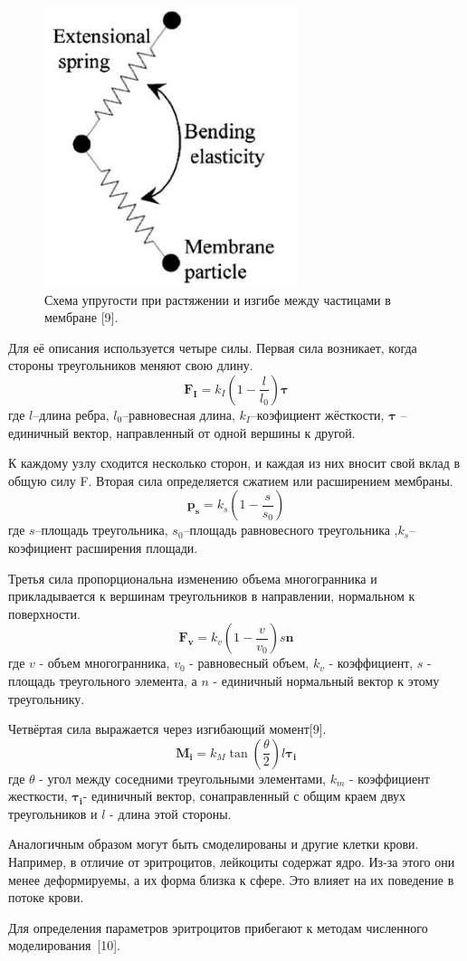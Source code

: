\begin{figure}[h]
\centering
\includegraphics[width=0.3\linewidth]{mol3.png}
\caption{ Схема упругости при растяжении и изгибе между частицами в мембране [9].}
\label{fig:mpr}
\end{figure}

Для её описания используется четыре силы.
Первая сила возникает, когда стороны треугольников меняют свою длину.
$$\mathbf {F_I}=k_I(1- \frac{l}{l_0}) \mathbf {\tau}$$
где $l$--длина ребра, $l_0$--равновесная длина, $k_I$--коэфициент жёсткости, $\mathbf { \tau}$ --единичный вектор, направленный от одной вершины к другой.

К каждому узлу сходится несколько сторон, и каждая из них вносит свой вклад в общую силу F. Вторая сила определяется сжатием или расширением мембраны.  
$$\mathbf {p_s}=k_s(1- \frac{s}{s_0})$$
где $s$--площадь треугольника, $s_0$--площадь равновесного треугольника ,$k_s$--коэфициент расширения площади.

Третья сила пропорциональна изменению объема многогранника и прикладывается к вершинам треугольников в направлении, нормальном к поверхности. 
$$\mathbf {F_v}=k_v(1- \frac{v}{v_0}) s \mathbf{n}$$
где $v$ - объем многогранника, $v_0$ - равновесный объем, $k_v$ - коэффициент, $s$ - площадь
треугольного элемента, а $n$ - единичный нормальный вектор к этому треугольнику.

Четвёртая сила выражается через изгибающий момент[9].
$$\mathbf {M_i}=k_M \tan(\frac{\theta}{2})l \mathbf{\tau_i}$$
где $\theta$ - угол между соседними треугольными элементами, $k_m$ - коэффициент жесткости, $\mathbf{\tau_i}$- единичный вектор, сонаправленный с общим краем двух треугольников и $l$ - длина этой стороны.

Аналогичным образом могут быть смоделированы и другие клетки крови. Например, в отличие от эритроцитов, лейкоциты содержат ядро. Из-за этого они менее деформируемы, а их форма близка к сфере. Это влияет на их поведение в потоке крови.

Для определения параметров эритроцитов прибегают к методам численного моделирования~[10].

